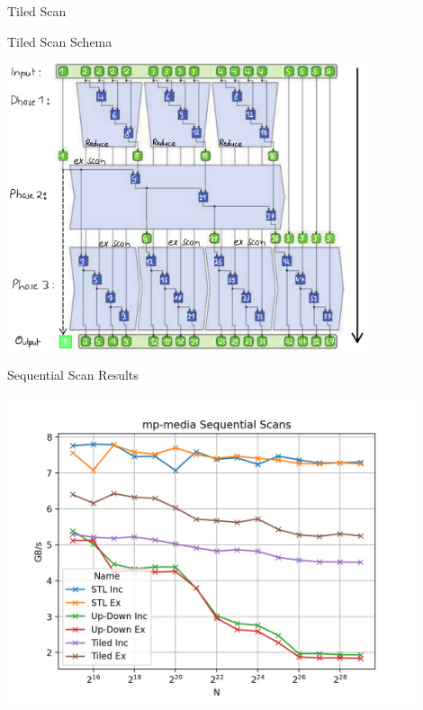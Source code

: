 \begin{frame}{Tiled Scan} 
\end{frame} 

\begin{frame}{Tiled Scan Schema}
 
  \centering
  \includegraphics[width=0.80\textwidth]{"wiki/3Phase Nice"}
 
\end{frame}

\begin{frame}{Sequential Scan Results}
 
  \centering
  \vspace{-5pt}
  \includegraphics[width=0.90\textwidth]{"graphs/mp-media Sequential Scans"}
 
\end{frame}
